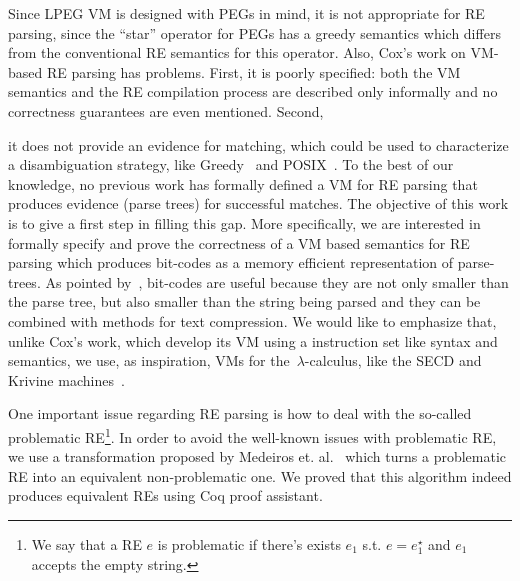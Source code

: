\documentclass[oneside,12pt]{scrbook}
\theoremstyle{definition}
\theoremstyle{plain}
\theoremstyle{definition}
\begin{document}
Since LPEG VM is designed with PEGs in mind, it is not appropriate for RE parsing, since the ``star''
operator for PEGs has a greedy semantics which differs from the conventional RE semantics for this operator. 
Also, Cox's work on VM-based RE parsing has problems. First, it is poorly specified: both the VM semantics and the RE
compilation process are described only informally and no correctness guarantees are even mentioned. Second,

it does not provide an evidence for matching, which could be used to characterize a disambiguation strategy, like
Greedy~\cite{Frisch2004} and POSIX~\cite{Sulzmann14}. To the best of our knowledge, no 
previous work has formally defined a VM for RE parsing that produces evidence (parse trees) for successful matches.
The objective of this work is to give a first step in filling this gap. More specifically, we are interested in formally
specify and prove the correctness of a VM based semantics for RE parsing which produces bit-codes as
a memory efficient representation of parse-trees. As pointed by~\cite{Lasse2011}, bit-codes are useful because they
are not only smaller than the parse tree, but also smaller than the string being parsed and they can be combined with methods
for text compression. We would like to emphasize that, unlike Cox's work, which develop its VM using a instruction 
set like syntax and semantics, we use, as inspiration, VMs for the~$\lambda$-calculus, like the 
SECD and Krivine machines~\cite{Krivine07,Landin64}. 

One important issue regarding RE parsing is how to deal with the so-called problematic 
RE\footnote{We say that a RE $e$ is problematic if there's exists $e_1$ s.t. $e = e_1^\star$ and 
	$e_1$ accepts the empty string.}\cite{Frisch2004}. In order to avoid the well-known issues with 
problematic RE, we use a transformation proposed by Medeiros et. al.~\cite{Medeiros14} which turns a
problematic RE into an equivalent non-problematic one. We proved that this algorithm indeed produces
equivalent REs using Coq proof assistant.
\end{document}
